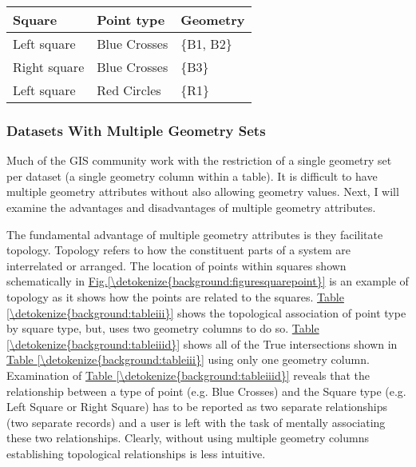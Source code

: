 \documentclass[a4paper,11pt,english]{sphinxmanual}
\begin{document}
\begin{savenotes}\sphinxattablestart
\centering
{}
\sphinxthecaptionisattop
{}\label{\detokenize{background:id35}}\label{\detokenize{background:tableiiid}}
\sphinxaftertopcaption
\begin{tabulary}{\linewidth}[t]{|T|T|T|}
\hline
\sphinxstyletheadfamily 
Square
&\sphinxstyletheadfamily 
Point type
&\sphinxstyletheadfamily 
Geometry
\\
\hline
Left square
&
Blue Crosses
&
\{B1, B2\}
\\
\hline
Right square
&
Blue Crosses
&
\{B3\}
\\
\hline
Left square
&
Red Circles
&
\{R1\}
\\
\hline
\end{tabulary}
\par
\sphinxattableend\end{savenotes}


\subsubsection{Datasets With Multiple Geometry Sets}
\label{\detokenize{background:datasets-with-multiple-geometry-sets}}
Much of the GIS community work with the restriction of a single geometry set per dataset (a single geometry column within a table).  It is difficult to have multiple geometry attributes without also allowing  geometry values.  Next, I will examine the advantages and disadvantages of multiple geometry attributes.

The fundamental advantage of multiple geometry attributes is they facilitate topology. Topology refers to how the constituent parts of a system are interrelated or arranged.  The location of points within squares shown schematically in \hyperref[\detokenize{background:figuresquarepoint}]{Fig.\@ \ref{\detokenize{background:figuresquarepoint}}} is an example of topology as it shows how the points are related to the squares.  \hyperref[\detokenize{background:tableiii}]{Table \ref{\detokenize{background:tableiii}}} shows the topological association of point type by square type, but, uses two geometry columns to do so.  \hyperref[\detokenize{background:tableiiid}]{Table \ref{\detokenize{background:tableiiid}}} shows all of the True intersections shown in \hyperref[\detokenize{background:tableiii}]{Table \ref{\detokenize{background:tableiii}}} using only one geometry column.  Examination of \hyperref[\detokenize{background:tableiiid}]{Table \ref{\detokenize{background:tableiiid}}} reveals that the relationship between a type of point (e.g. Blue Crosses) and the Square type (e.g. Left Square or Right Square) has to be reported as two separate relationships (two separate records) and a user is left with the task of mentally associating these two relationships.  Clearly, without using multiple geometry columns establishing topological relationships is less intuitive.
\end{document}
